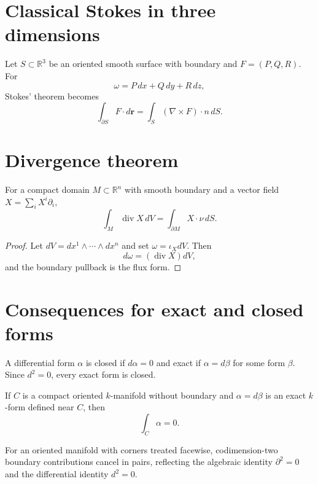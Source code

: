 \section{Classical Stokes in three dimensions}
\begin{corollary}\label{cor:vii11-curl}
Let $S\subset\mathbb R^3$ be an oriented smooth surface with boundary and $F=(P,Q,R)$. For
\[
\omega=P\,dx+Q\,dy+R\,dz,
\]
Stokes' theorem becomes
\[
\int_{\partial S}F\cdot d\mathbf r
=\int_S(\nabla\times F)\cdot n\,dS.
\]
\end{corollary}

\section{Divergence theorem}
\begin{corollary}\label{cor:vii11-divergence}
For a compact domain $M\subset\mathbb R^n$ with smooth boundary and a vector field $X=\sum_iX^i\partial_i$,
\[
\int_M\operatorname{div}X\,dV=\int_{\partial M}X\cdot\nu\,dS.
\]
\end{corollary}
\begin{proof}
Let $dV=dx^1\wedge\cdots\wedge dx^n$ and set $\omega=\iota_XdV$. Then
\[
d\omega=(\operatorname{div}X)dV,
\]
and the boundary pullback is the flux form.
\end{proof}

\section{Consequences for exact and closed forms}
\begin{definition}\label{def:vii11-closed-exact}
A differential form $\alpha$ is closed if $d\alpha=0$ and exact if $\alpha=d\beta$ for some form $\beta$. Since $d^2=0$, every exact form is closed.
\end{definition}

\begin{corollary}\label{cor:vii11-exact-cycle}
If $C$ is a compact oriented $k$-manifold without boundary and $\alpha=d\beta$ is an exact $k$-form defined near $C$, then
\[
\int_C\alpha=0.
\]
\end{corollary}

\begin{corollary}\label{cor:vii11-boundary-boundary}
For an oriented manifold with corners treated facewise, codimension-two boundary contributions cancel in pairs, reflecting the algebraic identity $\partial^2=0$ and the differential identity $d^2=0$.
\end{corollary}

